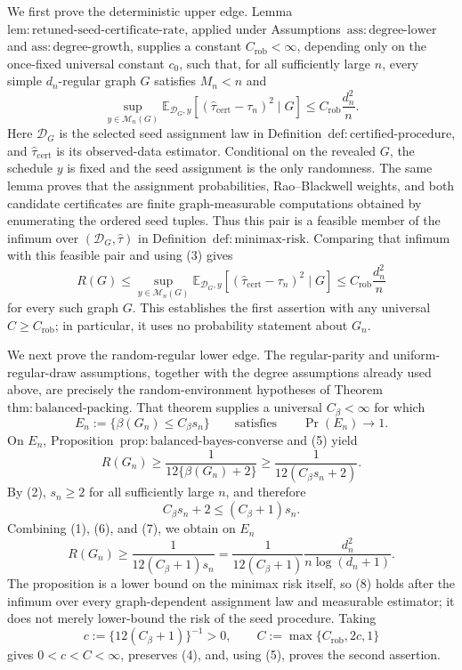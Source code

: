We first prove the deterministic upper edge.  Lemma~\(\mathrm{lem{:}retuned\mbox{-}seed\mbox{-}certificate\mbox{-}rate}\), applied under Assumptions~\(\mathrm{ass{:}degree\mbox{-}lower}\) and \(\mathrm{ass{:}degree\mbox{-}growth}\), supplies a constant \(C_{\mathrm{rob}}<\infty\), depending only on the once-fixed universal constant \(c_0\), such that, for all sufficiently large \(n\), every simple \(d_n\)-regular graph \(G\) satisfies \(M_n<n\) and
\[
\sup_{y\in\mathcal M_n(G)}
\mathbb E_{\mathcal D_G,y}\!\left[
  (\widehat\tau_{\mathrm{cert}}-\tau_n)^2\mid G
\right]
\le C_{\mathrm{rob}}\frac{d_n^2}{n}.
\tag{3}
\]
Here \(\mathcal D_G\) is the selected seed assignment law in Definition~\(\mathrm{def{:}certified\mbox{-}procedure}\), and \(\widehat\tau_{\mathrm{cert}}\) is its observed-data estimator.  Conditional on the revealed \(G\), the schedule \(y\) is fixed and the seed assignment is the only randomness.  The same lemma proves that the assignment probabilities, Rao--Blackwell weights, and both candidate certificates are finite graph-measurable computations obtained by enumerating the ordered seed tuples.  Thus this pair is a feasible member of the infimum over \((\mathcal D_G,\widehat\tau)\) in Definition~\(\mathrm{def{:}minimax\mbox{-}risk}\).  Comparing that infimum with this feasible pair and using (3) gives
\[
R(G)
\le
\sup_{y\in\mathcal M_n(G)}
\mathbb E_{\mathcal D_G,y}\!\left[
  (\widehat\tau_{\mathrm{cert}}-\tau_n)^2\mid G
\right]
\le C_{\mathrm{rob}}\frac{d_n^2}{n}
\tag{4}
\]
for every such graph \(G\).  This establishes the first assertion with any universal \(C\ge C_{\mathrm{rob}}\); in particular, it uses no probability statement about \(G_n\).

We next prove the random-regular lower edge.  The regular-parity and uniform-regular-draw assumptions, together with the degree assumptions already used above, are precisely the random-environment hypotheses of Theorem~\(\mathrm{thm{:}balanced\mbox{-}packing}\).  That theorem supplies a universal \(C_\beta<\infty\) for which
\[
E_n:=\{\beta(G_n)\le C_\beta s_n\}
\qquad\text{satisfies}\qquad
\Pr(E_n)\longrightarrow1.
\tag{5}
\]
On \(E_n\), Proposition~\(\mathrm{prop{:}balanced\mbox{-}bayes\mbox{-}converse}\) and (5) yield
\[
R(G_n)
\ge \frac{1}{12\{\beta(G_n)+2\}}
\ge \frac{1}{12(C_\beta s_n+2)}.
\tag{6}
\]
By (2), \(s_n\ge2\) for all sufficiently large \(n\), and therefore
\[
C_\beta s_n+2\le(C_\beta+1)s_n.
\tag{7}
\]
Combining (1), (6), and (7), we obtain on \(E_n\)
\[
R(G_n)
\ge \frac{1}{12(C_\beta+1)s_n}
=\frac{1}{12(C_\beta+1)}
  \frac{d_n^2}{n\log(d_n+1)}.
\tag{8}
\]
The proposition is a lower bound on the minimax risk itself, so (8) holds after the infimum over every graph-dependent assignment law and measurable estimator; it does not merely lower-bound the risk of the seed procedure.  Taking
\[
c:=\{12(C_\beta+1)\}^{-1}>0,
\qquad
C:=\max\{C_{\mathrm{rob}},2c,1\}
\tag{9}
\]
gives \(0<c<C<\infty\), preserves (4), and, using (5), proves the second assertion.

